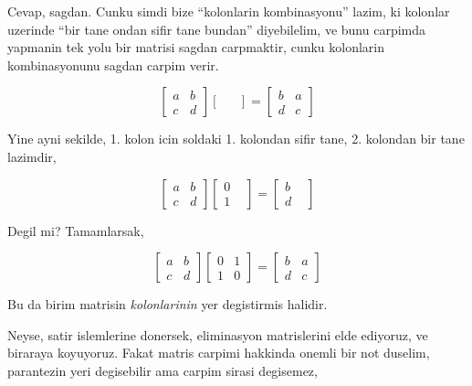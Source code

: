 \documentclass[12pt,fleqn]{article}\usepackage{../common}
\begin{document}
Cevap, sagdan. Cunku simdi bize ``kolonlarin kombinasyonu'' lazim, ki
kolonlar uzerinde ``bir tane ondan sifir tane bundan'' diyebilelim, ve bunu
carpimda yapmanin tek yolu bir matrisi sagdan carpmaktir, cunku kolonlarin
kombinasyonunu sagdan carpim verir. 

$$ 
\left[\begin{array}{rr}
a & b \\
c & d
\end{array}\right]
\left[\begin{array}{rr}
 &  \\
 & 
\end{array}\right]
=
\left[\begin{array}{rr}
b & a \\
d & c
\end{array}\right]
 $$

Yine ayni sekilde, 1. kolon icin soldaki 1. kolondan sifir tane,
2. kolondan bir tane lazimdir, 

$$ 
\left[\begin{array}{rr}
a & b \\
c & d
\end{array}\right]
\left[\begin{array}{rr}
0 &  \\
1 & 
\end{array}\right]
=
\left[\begin{array}{rr}
b &  \\
d & 
\end{array}\right]
 $$

Degil mi? Tamamlarsak,

$$ 
\left[\begin{array}{rr}
a & b \\
c & d
\end{array}\right]
\left[\begin{array}{rr}
0 & 1 \\
1 & 0
\end{array}\right]
=
\left[\begin{array}{rr}
b & a \\
d & c
\end{array}\right]
 $$

Bu da birim matrisin {\em kolonlarinin} yer degistirmis halidir. 

Neyse, satir islemlerine donersek, eliminasyon matrislerini elde ediyoruz,
ve biraraya koyuyoruz. Fakat matris carpimi hakkinda onemli bir not
duselim, parantezin yeri degisebilir ama carpim sirasi degisemez,
\end{document}
